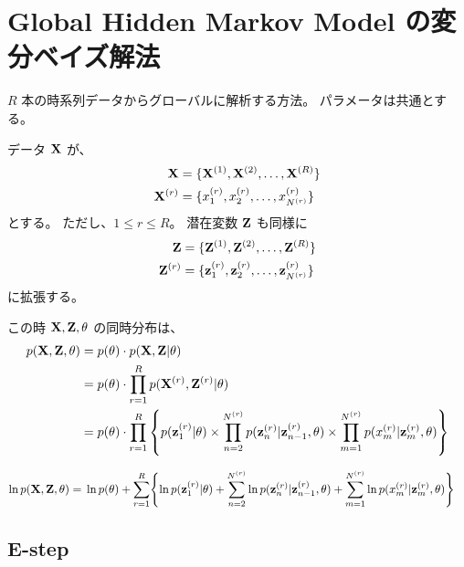 
\section{ Global Hidden Markov Model の変分ベイズ解法 }
\label{sec:globalVarBayesHmm}

$R$ 本の時系列データからグローバルに解析する方法。
パラメータは共通とする。

データ ${\bf X}$ が、
\begin{align}
  {\bf X}  =\;&  \{ {\bf X}^{(1)}, {\bf X}^{(2)}, \dots, {\bf X}^{(R)} \}  \\
  {\bf X}^{(r)}  =\;&  \{ x_1^{(r)}, x_2^{(r)}, \dots, x_{N^{(r)}}^{(r)} \}
\end{align}
とする。
ただし、$1 \le r \le R$。
潜在変数 ${\bf Z}$ も同様に
\begin{align}
  {\bf Z}  =\;&  \{ {\bf Z}^{(1)}, {\bf Z}^{(2)}, \dots, {\bf Z}^{(R)} \}  \\
  {\bf Z}^{(r)}  =\;&  \{ {\bf z}_1^{(r)}, {\bf z}_2^{(r)}, \dots, {\bf z}_{N^{(r)}}^{(r)} \}
\end{align}
に拡張する。

この時 ${\bf X}, {\bf Z}, \theta$ の同時分布は、
\begin{align}
  p( {\bf X}, {\bf Z}, \theta )  =\;&  p(\theta) \cdot p( {\bf X}, {\bf Z} | \theta )  \\
%
  =\;&  p(\theta) \cdot \prod_{r=1}^R  p( {\bf X}^{(r)}, {\bf Z}^{(r)} | \theta )  \\
%
  =\;&  p(\theta) \cdot \prod_{r=1}^R \left\{  p( {\bf z}_1^{(r)} | \theta ) \times \prod_{n=2}^{N^{(r)}} p( {\bf z}_n^{(r)} | {\bf z}_{n-1}^{(r)}, \theta ) \times \prod_{m=1}^{N^{(r)}} p( x_m^{(r)} | {\bf z}_m^{(r)}, \theta )  \right\}  
\end{align}

\begin{align}
  \ln p( {\bf X}, {\bf Z}, \theta )  =\;&  \ln p(\theta)  %
    +  \sum_{r=1}^R \Biggl\{  %
      \ln p( {\bf z}_1^{(r)} | \theta )  %
      + \sum_{n=2}^{N^{(r)}} \ln p( {\bf z}_n^{(r)} | {\bf z}_{n-1}^{(r)}, \theta )  %
      + \sum_{m=1}^{N^{(r)}} \ln p( x_m^{(r)} | {\bf z}_m^{(r)}, \theta )  %
    \Biggr\}  
\end{align}


\subsection{ E-step }

